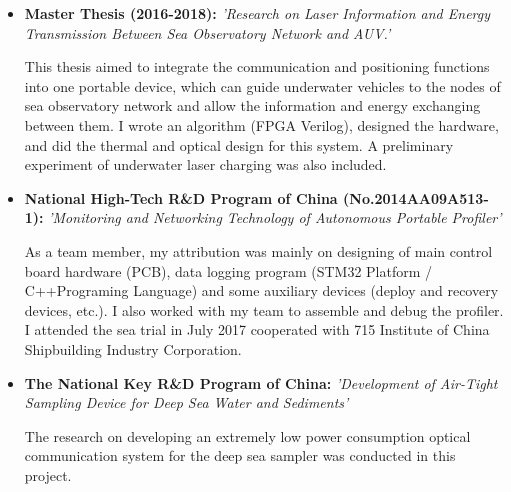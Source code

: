 \documentclass[11pt,a4paper,sans]{moderncv}         %
\begin{document}
\vspace{3pt}

\begin{itemize}

	\vspace{5pt}

	\item{\textbf{Master Thesis (2016-2018): }\textit{'Research on Laser Information and Energy Transmission Between Sea Observatory Network and AUV.'}

	      \vspace{3pt}

	      \small{This thesis aimed to integrate the communication and positioning functions into one portable device, which can guide underwater vehicles to the nodes of sea observatory network and allow the information and energy exchanging between them. I wrote an algorithm (FPGA Verilog), designed the hardware, and did the thermal and optical design for this system. A preliminary experiment of underwater laser charging was also included.}}

	      \vspace{6pt}

	\item{\textbf{National High-Tech R\&D Program of China (No.2014AA09A513-1): }\textit{'Monitoring and Networking Technology of Autonomous Portable Profiler'}

	      \vspace{3pt}

	      \small{As a team member, my attribution was mainly on designing of main control board hardware (PCB), data logging program (STM32 Platform / C++Programing Language) and some auxiliary devices (deploy and recovery devices, etc.). I also worked with my team to assemble and debug the profiler. I attended the sea trial in July 2017 cooperated with 715 Institute of China Shipbuilding Industry Corporation.}}

	      \vspace{6pt}

	\item{\textbf{The National Key R\&D Program of China: }\textit{'Development of Air-Tight Sampling Device for Deep Sea Water and Sediments'}

	      \vspace{3pt}

	      \small{The research on developing an extremely low power consumption optical communication system for the deep sea sampler was conducted in this project.}}


\end{itemize}
\end{document}
